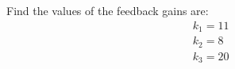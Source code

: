 \documentclass[12pt, letterpaper]{../assignment}
\begin{document}
\begin{answer}
Find the values of the feedback gains are:
\begin{equation*}
    \begin{aligned}
        &k_{1} = 11\\
        &k_{2} = 8\\
        &k_{3} = 20
    \end{aligned}
\end{equation*}

\end{answer}


\end{document}
